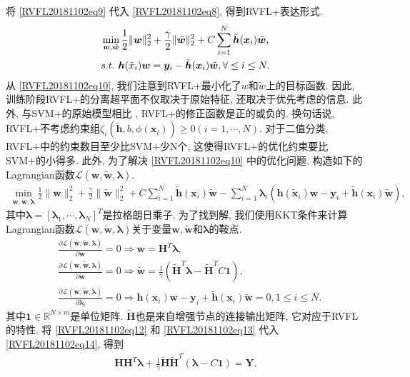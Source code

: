 将 \eqref{RVFL20181102eq9} 代入 \eqref{RVFL20181102eq8}, 得到RVFL+表达形式.
\begin{align}
    &\min\limits_{{\bm w},\tilde {\bm w}} \frac 1 2\|{\bm w}\|_2^ 2 + \frac \gamma 2 \|\tilde {\bm w}\|_2^ 2 + C\sum_{i=1}^N  {\tilde {\bm h}}({\bm x}_i)\tilde {\bm w},\notag\\
    &s.t.\,\,\bm h(\tilde x_i){\bm w} =\bm y_i - {\tilde {\bm h}}({\bm x}_i)\tilde {\bm w}, \forall \leq i \leq  N.\label{RVFL20181102eq10}
\end{align}
从 \eqref{RVFL20181102eq10}, 我们注意到RVFL+最小化了$w$和$\tilde w$上的目标函数. 因此, 训练阶段RVFL+的分离超平面不仅取决于原始特征, 还取决于优先考虑的信息.
此外, 与SVM+的原始模型相比 \cite{VAPNIK2009544}, RVFL+的修正函数是正的或负的.
换句话说, RVFL+不考虑约束组$\zeta_i(\tilde{\bm h}, b, \phi({\bm x}_i))\geq 0(i=1, \cdots, N)$.
对于二值分类, RVFL+中的约束数目至少比SVM+少N个, 这使得RVFL+的优化约束要比SVM+的小得多.
此外, 为了解决 \eqref{RVFL20181102eq10} 中的优化问题, 构造如下的Lagrangian函数$\mathscr L(\bm w, \tilde{\bm w}, \bm\lambda)$.
\begin{align}
    \min\limits_{\bm w, \tilde{\bm w},\bm \lambda} \frac 1 2\|{\bm w}\|_2^ 2 + \frac \gamma 2 \|\tilde {\bm w}\|_2^ 2 + C\sum_{i=1}^N  {\tilde {\bm h}}({\bm x}_i)\tilde {\bm w}-\sum_{i=1}^N  \bm \lambda_i(\bm h(\tilde {\bm x}_i){\bm w} -\bm y_i +{\tilde {\bm h}}({\bm x}_i)\tilde {\bm w}),
\end{align}
其中$\bm\lambda=[\bm\lambda_1, \cdots, \bm\lambda_N]^T$是拉格朗日乘子. 为了找到解, 我们使用KKT条件来计算Lagrangian函数$\mathscr L(\bm w, \tilde{\bm w},\bm\lambda)$关于变量$\bm w,\tilde{\bm w}$和$\bm\lambda$的鞍点.
\begin{align}
 &\frac {\partial \mathscr L (\bm w, \tilde{\bm w},\bm \lambda)}{\partial \bm w}= 0 \Rightarrow  \bm w = \bm  H^T \bm \lambda, \label{RVFL20181102eq12}\\
 &\frac {\partial \mathscr L (\bm w, \tilde{\bm w},\bm \lambda)}{\partial \tilde{\bm w}} = 0 \Rightarrow  \tilde{\bm w} = \frac 1  \gamma  (\tilde{\bm  H}^T  \bm \lambda - \tilde{\bm  H}^T C \bm 1), \label{RVFL20181102eq13}\\
 &\frac {\partial \mathscr L (\bm w, \tilde{\bm w},\bm \lambda)}{\partial \bm \lambda_i} = 0 \Rightarrow  \bm h(\bm x_i)\bm w - \bm y_i + \tilde {\bm h}({\bm x}_i) \tilde{\bm w} = 0, 1 \leq  i \leq  N.\label{RVFL20181102eq14}
\end{align}
其中$\bm 1\in\mathbb R^{N\times m}$是单位矩阵. $\tilde{\bm H}$也是来自增强节点的连接输出矩阵, 它对应于RVFL的特性.
将 \eqref{RVFL20181102eq12} 和 \eqref{RVFL20181102eq13} 代入 \eqref{RVFL20181102eq14}, 得到
\begin{align}
    \bm H \bm H^T  \bm \lambda + \frac 1 \gamma\tilde{\bm H} \tilde{\bm H}^T  (\bm \lambda -C \bm 1) = \bm Y. \label{RVFL20181102eq15}
\end{align}

